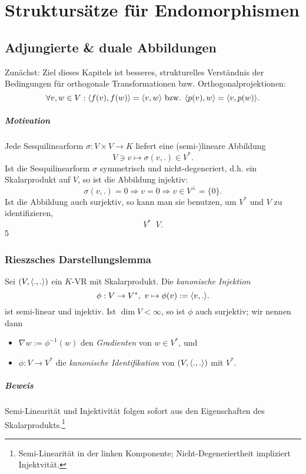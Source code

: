 \chapter{Struktursätze für Endomorphismen}
\section{Adjungierte \& duale Abbildungen}
	Zunächst: Ziel dieses Kapitels ist besseres, strukturelles Verständnis der Bedingungen für orthogonale Transformationen bzw. Orthogonalprojektionen:
		\[ \forall v,w\in V: \langle f(v),f(w) \rangle = \langle v,w \rangle \text{ bzw. } \langle p(v),w \rangle = \langle v,p(w) \rangle. \]
\paragraph{Motivation}
	Jede Sesquilinearform $ \sigma: V\times V\to K $ liefert  eine (semi-)lineare Abbildung
		\[ V\ni v\mapsto \sigma(v,.)\in V^*. \]
	Ist die Sesquilinearform $ \sigma $ symmetrisch und nicht-degeneriert, d.h. ein Skalarprodukt auf $ V $, so ist die Abbildung injektiv:
		\[ \sigma(v,.) = 0 \Rightarrow v = 0 \Rightarrow v\in V^\perp = \{0\}. \]
	Ist die Abbildung auch surjektiv, so kann man sie benutzen, um $ V^* $ und $ V $ zu identifizieren,
		\[ V^* \mathop{\overline{\simeq}} V. \]
5\subsection{Rieszsches Darstellungslemma}
\begin{Lemma}
	Sei $ (V,\langle .,. \rangle) $ ein $ K $-VR mit Skalarprodukt. Die \emph{kanonische Injektion}
		\[ \phi : V\to V^*,\ v\mapsto \phi(v):= \langle v,. \rangle. \]
	ist semi-linear und injektiv. Ist $ \dim V < \infty $, so ist $ \phi $ auch surjektiv; wir nennen dann
		\begin{itemize}
			\item $\nabla w := \phi^{-1}(w) $ den \emph{Gradienten} von $ w\in V^* $, und
			\item $ \phi: V\to V^* $ die \emph{kanonische Identifikation} von $ (V,\langle .,. \rangle) $ mit $ V^* $.
		\end{itemize}
\end{Lemma}
\paragraph{Beweis}
	Semi-Linearität und Injektivität folgen sofort aus den Eigenschaften des Skalarprodukts.\footnote{Semi-Linearität in der linken Komponente; Nicht-Degeneriertheit impliziert Injektvität.}
	
